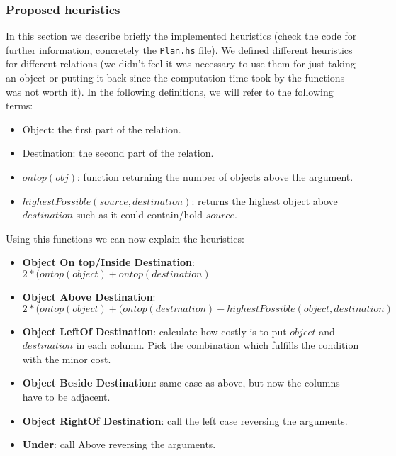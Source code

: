\documentclass[11pt]{article}
\begin{document}
        \subsubsection{Proposed heuristics}
        In this section we describe briefly the implemented heuristics (check the code for
         further information, concretely the \texttt{Plan.hs} file). We defined different 
         heuristics for different relations (we didn't feel it was necessary to use them 
         for just taking an object or putting it back since the computation time took by the
         functions was not worth it). In the following definitions, we will refer to the 
         following terms:

         \begin{itemize}
          \item Object: the first part of the relation.
          \item Destination: the second part of the relation.
          \item $ontop(obj)$: function returning the number of objects above the argument.
          \item $highestPossible(source, destination)$: returns the highest object 
          above $destination$ such as it could contain/hold $source$.
         \end{itemize}

         Using this functions we can now explain the heuristics:

        \begin{itemize}
          \item {\bf Object On top/Inside Destination}: 
            $2 * (ontop(object) + ontop(destination)$
          \item {\bf Object Above Destination}:
            $2 * (ontop(object) + (ontop(destination) - highestPossible(object, destination)$
          \item {\bf Object LeftOf Destination}: calculate how costly is to put $object$ 
          and $destination$ in each column. Pick the combination which fulfills the 
          condition with the minor cost.
          \item {\bf Object Beside Destination}: same case as above, but now the columns 
          have to be adjacent.
          \item {\bf Object RightOf Destination}: call the left case reversing the 
          arguments.
          \item {\bf Under}: call Above reversing the arguments.
        \end{itemize}
\end{document}
